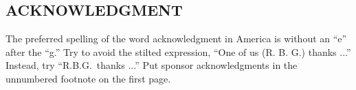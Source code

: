 \documentclass{article}
\begin{document}
\begin{sloppy}
\section{ACKNOWLEDGMENT}
\label{sec:ack}

The preferred spelling of the word acknowledgment in 
America is without an ``e'' after the ``g.'' Try to avoid 
the stilted expression, ``One of us (R. B. G.) thanks ...''
Instead, try ``R.B.G.\ thanks ...''  Put sponsor 
acknowledgments in the unnumbered footnote on the first page.



%
% 
%
%
%
% 
%
% 
% 


\end{sloppy}
\end{document}
